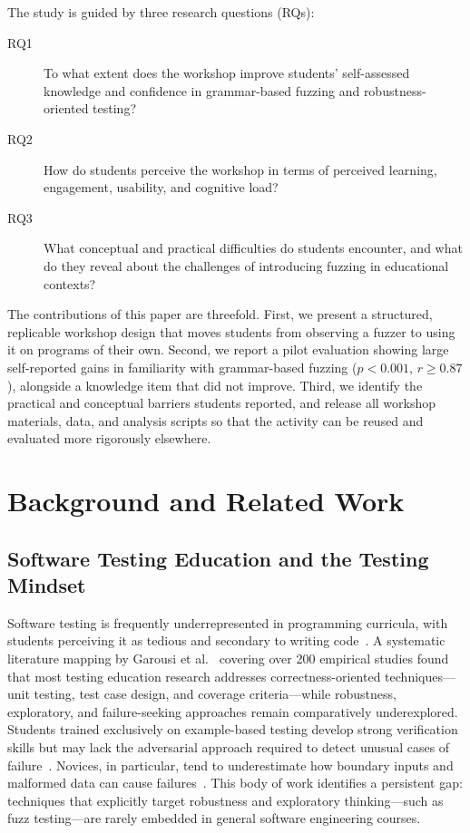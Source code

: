 \documentclass[conference]{IEEEtran}
\begin{document}
The study is guided by three research questions (RQs):
\begin{description}
    \item[RQ1] To what extent does the workshop improve students' self-assessed knowledge and confidence in grammar-based fuzzing and robustness-oriented testing?
    \item[RQ2] How do students perceive the workshop in terms of perceived learning, engagement, usability, and cognitive load?
    \item[RQ3] What conceptual and practical difficulties do students encounter, and what do they reveal about the challenges of introducing fuzzing in educational contexts?
\end{description}

The contributions of this paper are threefold.
First, we present a structured, replicable workshop design that moves students from observing a fuzzer to using it on programs of their own.
Second, we report a pilot evaluation showing large self-reported gains in familiarity with grammar-based fuzzing ($p < 0.001$, $r \geq 0.87$), alongside a knowledge item that did not improve.
Third, we identify the practical and conceptual barriers students reported, and release all workshop materials, data, and analysis scripts so that the activity can be reused and evaluated more rigorously elsewhere.

\section{Background and Related Work}
\label{sec:background}

\subsection{Software Testing Education and the Testing Mindset}

Software testing is frequently underrepresented in programming curricula, with students perceiving it as tedious and secondary to writing code~\cite{garousi2020testing}.
A systematic literature mapping by Garousi et al.~\cite{garousi2020testing} covering over 200 empirical studies found that most testing education research addresses correctness-oriented techniques---unit testing, test case design, and coverage criteria---while robustness, exploratory, and failure-seeking approaches remain comparatively underexplored.
Students trained exclusively on example-based testing develop strong verification skills but may lack the adversarial approach required to detect unusual cases of failure~\cite{ammann2016introduction}.
Novices, in particular, tend to underestimate how boundary inputs and malformed data can cause failures~\cite{mccauley2008debugging}.
This body of work identifies a persistent gap: techniques that explicitly target robustness and exploratory thinking---such as fuzz testing---are rarely embedded in general software engineering courses.
\end{document}
